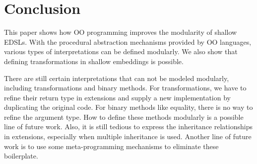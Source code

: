 \section{Conclusion}
This paper shows how OO programming improves the modularity of shallow EDSLs.
With the procedural abstraction mechanisms provided by OO languages, various types of
interpretations can be defined modularly. We also show that defining
transformations in shallow embeddings is possible.

There are still certain interpretations that can not be modeled modularly,
including transformations and binary methods.
For transformations, we have to refine their return type in extensions and
supply a new implementation by duplicating the original code.
For binary methods like equality, there is no way to refine the argument type.
How to define these methods modularly is a possible line of future work.
Also, it is still tedious to express the inheritance relationships in extensions,
especially when multiple inheritance is used. Another line of future work is to
use some meta-programming mechanisms to eliminate these boilerplate.